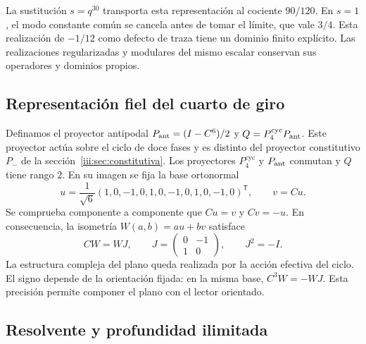 La sustitución $s=q^{30}$ transporta esta representación al cociente
$90/120$. En $s=1$, el modo constante común se cancela antes de tomar el
límite, que vale $3/4$. Esta realización de $-1/12$ como defecto de traza
tiene un dominio finito explícito. Las realizaciones regularizadas y
modulares del mismo escalar conservan sus operadores y dominios propios.

\subsection{Representación fiel del cuarto de giro}

Definamos el proyector antipodal $P_{\rm ant}=(I-C^6)/2$ y
$Q=P_4^{\mathrm{cyc}}P_{\rm ant}$. Este proyector actúa sobre el ciclo de doce fases y es
distinto del proyector constitutivo $P_-$ de la sección~\ref{iii:sec:constitutiva}.
Los proyectores $P_4^{\mathrm{cyc}}$ y $P_{\rm ant}$ conmutan y
$Q$ tiene rango $2$. En su imagen se fija la base ortonormal
\begin{equation}
 u=\frac1{\sqrt6}(1,0,-1,0,1,0,-1,0,1,0,-1,0)^{\mathsf T},
 \qquad v=Cu.
 \label{iii:eq:uv}
\end{equation}
Se comprueba componente a componente que $Cu=v$ y $Cv=-u$. En consecuencia,
la isometría $W(a,b)=au+bv$ satisface
\begin{equation}
 CW=WJ,\qquad
 J=\begin{pmatrix}0&-1\\1&0\end{pmatrix},\qquad J^2=-I.
 \label{iii:eq:quarter-intertwiner}
\end{equation}
La estructura compleja del plano queda realizada por la acción efectiva del
ciclo. El signo depende de la orientación fijada: en la misma base,
$C^3W=-WJ$. Esta precisión permite componer el plano con el lector orientado.

\subsection{Resolvente y profundidad ilimitada}

